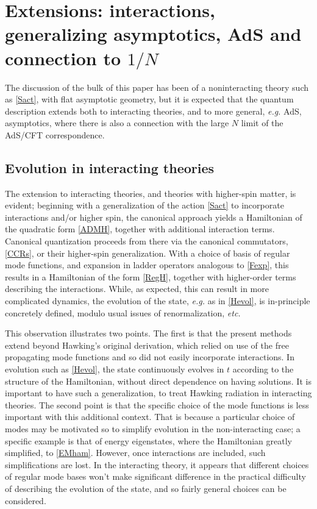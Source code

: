 \documentclass[12pt]{article}
\numberwithin{equation}{section}
\begin{document}
\section{Extensions: interactions, generalizing asymptotics, AdS and connection to $1/N$}

The discussion of the bulk of this paper has been of a noninteracting theory such as \eqref{Sact}, with flat asymptotic geometry, but it is expected that the quantum description extends both to interacting theories, and to more general, {\it e.g.} AdS, asymptotics, where there is also a connection with the large $N$ limit of the AdS/CFT correspondence.

\subsection{Evolution in interacting theories}

The extension to interacting theories, and theories with higher-spin matter, is evident; beginning with a generalization of the action \eqref{Sact} to incorporate interactions and/or higher spin, 
 the canonical approach yields a Hamiltonian of the quadratic  form \eqref{ADMH}, together with additional interaction terms.  Canonical quantization proceeds from there via the canonical commutators, \eqref{CCRs}, or their higher-spin generalization.  With a choice of basis of regular mode functions, and expansion in ladder operators analogous to \eqref{Fexp}, this results in a Hamiltonian of the form \eqref{RegH}, together with higher-order terms describing the interactions.  While, as expected, this can result in more complicated dynamics, the evolution of the state, {\it e.g.} as in \eqref{Hevol}, is in-principle concretely defined, modulo usual issues of renormalization, {\it etc.} 

This observation illustrates two points.  The first is that the present methods extend beyond Hawking's original derivation\cite{Hawk}, which relied on use of the free propagating mode functions and so did not easily incorporate interactions.  In evolution such as \eqref{Hevol}, the state continuously evolves in $t$ according to the structure of the Hamiltonian, without direct dependence on having solutions.  It is important to have such a generalization, to treat Hawking radiation in interacting theories.  The second point is that the specific choice of the mode functions is less important with this additional context.  That is because a particular choice of modes may be motivated so to simplify evolution in the non-interacting case; a specific example is that of energy eigenstates, where the Hamiltonian greatly simplified, to \eqref{EMham}.  However, once interactions are included, such simplifications are lost.  In the interacting theory, it appears that different choices of regular mode bases won't make significant difference in the practical difficulty of describing the evolution of the state, and so fairly general choices can be considered.
\end{document}
